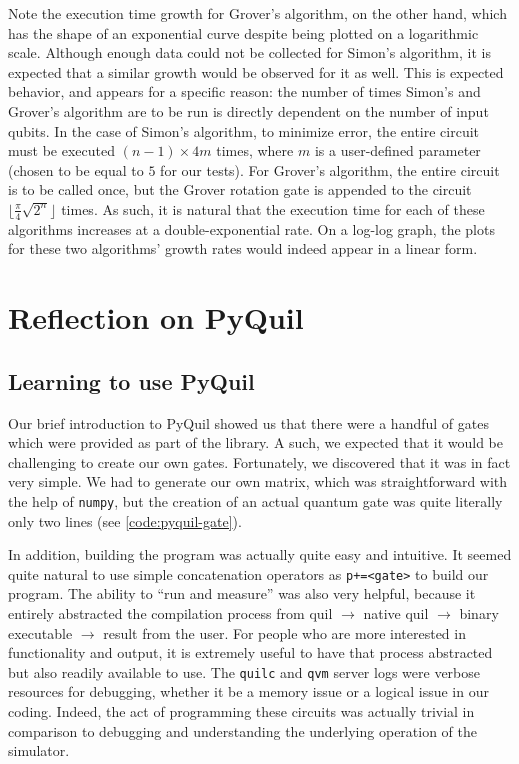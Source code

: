 \documentclass[12pt]{article}
\begin{document}
Note the execution time growth for Grover's algorithm, on the other hand, which has the shape of an exponential curve despite being plotted on a logarithmic scale.
Although enough data could not be collected for Simon's algorithm, it is expected that a similar growth would be observed for it as well.
This is expected behavior, and appears for a specific reason: the number of times Simon's and Grover's algorithm are to be run is directly dependent on the number of input qubits.
In the case of Simon's algorithm, to minimize error, the entire circuit must be executed $(n-1)\times4m$ times, where $m$ is a user-defined parameter (chosen to be equal to $5$ for our tests).
For Grover's algorithm, the entire circuit is to be called once, but the Grover rotation gate is appended to the circuit $\lfloor\frac{\pi}{4}\sqrt{2^n}\rfloor$ times.
As such, it is natural that the execution time for each of these algorithms increases at a double-exponential rate.
On a log-log graph, the plots for these two algorithms' growth rates would indeed appear in a linear form.

\section{Reflection on PyQuil}

\subsection{Learning to use PyQuil}

Our brief introduction to PyQuil showed us that there were a handful of gates which were provided as part of the library.
A such, we expected that it would be challenging to create our own gates.
Fortunately, we discovered that it was in fact very simple.
We had to generate our own matrix, which was straightforward with the help of \texttt{numpy}, but the creation of an actual quantum gate was quite literally only two lines (see \autoref{code:pyquil-gate}).


In addition, building the program was actually quite easy and intuitive.
It seemed quite natural to use simple concatenation operators as \texttt{p+=<gate>} to build our program.
The ability to ``run and measure'' was also very helpful, because it entirely abstracted the compilation process from quil $\to$ native quil $\to$ binary executable $\to$ result from the user.
For people who are more interested in functionality and output, it is extremely useful to have that process abstracted but also readily available to use.
The \texttt{quilc} and \texttt{qvm} server logs were verbose resources for debugging, whether it be a memory issue or a logical issue in our coding.
Indeed, the act of programming these circuits was actually trivial in comparison to debugging and understanding the underlying operation of the simulator.
\end{document}
